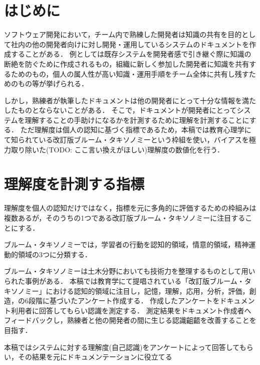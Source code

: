 \section{はじめに}
ソフトウェア開発において，チーム内で熟練した開発者は知識の共有を目的として社内の他の開発者向けに対し開発・運用しているシステムのドキュメントを作成することがある．
例としては既存システムを開発者感で引き継ぐ際に知識の断絶を防ぐために作成されるもの，組織に新しく参加した開発者に知識を共有するためのもの，個人の属人性が高い知識・運用手順をチーム全体に共有し残すためのもの等が挙げられる．

しかし，熟練者が執筆したドキュメントは他の開発者にとって十分な情報を満たしたものとならないことがある．
そこで，ドキュメントが開発者にとってシステムを理解することの手助けになるかを計測するために理解を計測することにする．
ただ理解度は個人の認知に基づく指標であるため，本稿では教育心理学にて知られている改訂版ブルーム・タキソノミー\cite{bib:nakao}という枠組を使い，バイアスを極力取り除いた(TODO: ここ言い換えがほしい)理解度の数値化を行う．

\section{理解度を計測する指標}
理解度を個人の認知だけではなく，指標を元に多角的に評価するための枠組みは複数あるが，そのうちの1つである改訂版ブルーム・タキソノミーに注目することにする．

ブルーム・タキソノミーでは，学習者の行動を認知的領域，情意的領域，精神運動的領域の3つに分類する．


ブルーム・タキソノミーは土木分野においても技術力を整理するものとして用いられた事例がある．\cite{bib:miyahara}
本稿では教育学にて提唱されている「改訂版ブルーム・タキソノミー」における認知的領域に注目し，記憶，理解，応用，分析，評価，創造，の6段階に基づいたアンケート作成する．
作成したアンケートをドキュメント利用者に回答してもらい認識を測定する．
測定結果をドキュメント作成者へフィードバックし，熟練者と他の開発者の間に生じる認識齟齬を改善することを目指す．

本稿ではシステムに対する理解度(自己認識)をアンケートによって回答してもらい，その結果を元にドキュメンテーションに役立てる




